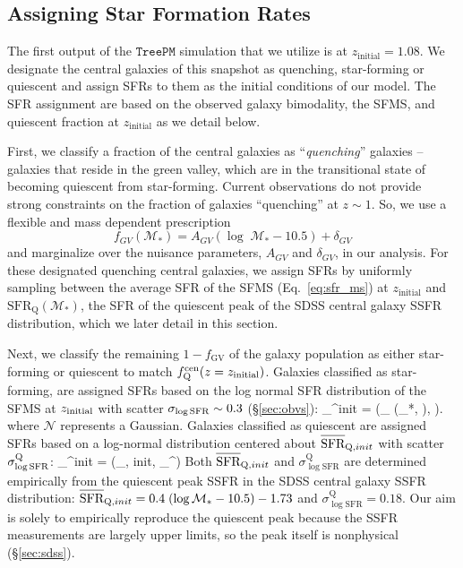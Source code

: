 \subsection{Assigning Star Formation Rates} \label{sec:sfr_assign}
The first output of the $\mathtt{TreePM}$ simulation that we 
utilize is at $z_\mathrm{initial} = 1.08$. We designate the central
galaxies of this snapshot as quenching, star-forming or quiescent
and assign SFRs to them as the initial conditions of our model. 
The SFR assignment are based on the observed galaxy bimodality, 
the SFMS, and quiescent fraction at $z_\mathrm{initial}$ as we 
detail below.

First, we classify a fraction of the central galaxies as 
``{\em quenching}'' galaxies -- galaxies that reside in the 
green valley, which are in the transitional state of becoming 
quiescent from star-forming. Current observations do not provide 
strong constraints on the fraction of galaxies ``quenching''
at $z \sim 1$. So, we use a flexible and mass dependent prescription  
\begin{equation} \label{eq:f_gv}
f_{GV}(\mathcal{M}_*) = A_{GV} (\log\;\mathcal{M}_* - 10.5) + \delta_{GV}
\end{equation}
and marginalize over the nuisance parameters, $A_{GV}$ and $\delta_{GV}$, 
in our analysis. For these designated quenching central galaxies,
we assign SFRs by uniformly sampling between the average SFR of the 
SFMS (Eq.~\ref{eq:sfr_ms}) at $z_\mathrm{initial}$ and 
$\mathrm{SFR}_\mathrm{Q}(\mathcal{M}_*)$, the 
SFR of the quiescent peak of the SDSS central galaxy SSFR 
distribution, which we later detail in this section.  

Next, we classify the remaining $1 - f_\mathrm{GV}$ of the galaxy population  
as either star-forming or quiescent to match $f_\mathrm{Q}^\mathrm{cen}(z=z_\mathrm{initial})$. 
Galaxies classified as star-forming, are assigned SFRs based on the 
log normal SFR distribution of the SFMS at $z_\mathrm{initial}$ with scatter 
$\sigma_{\log \mathrm{SFR}} \sim 0.3$ 
(\S \ref{sec:obvs}):
\beq
\log {}_^{init} =  (\log \avgSFR_
\left(_*, \zinit),  \right).
\eeq
where $\mathcal{N}$ represents a Gaussian.
Galaxies classified as quiescent are assigned SFRs based on a 
log-normal distribution centered about $\avgSFR_{\mathrm{Q},init}$ 
with scatter $\sigma_{\log \mathrm{SFR}}^\mathrm{Q}$: 
\beq
\log {}_^{init} = 
(\avgSFR_{, init}, \sigma_{\log {}}^)
\eeq
Both $\avgSFR_{\mathrm{Q},init}$ and 
$\sigma_{\log \mathrm{SFR}}^\mathrm{Q}$ are determined 
empirically from the quiescent peak SSFR in the SDSS 
central galaxy SSFR distribution: 
$\avgSFR_{\mathrm{Q}, init} = 0.4\;(\log\mathcal{M}_* - 10.5) - 1.73$
and $\sigma_{\log \mathrm{SFR}}^\mathrm{Q} = 0.18$.
Our aim is solely to empirically reproduce the quiescent peak because the 
SSFR measurements are largely upper limits, so the peak itself is nonphysical 
(\S \ref{sec:sdss}). 


